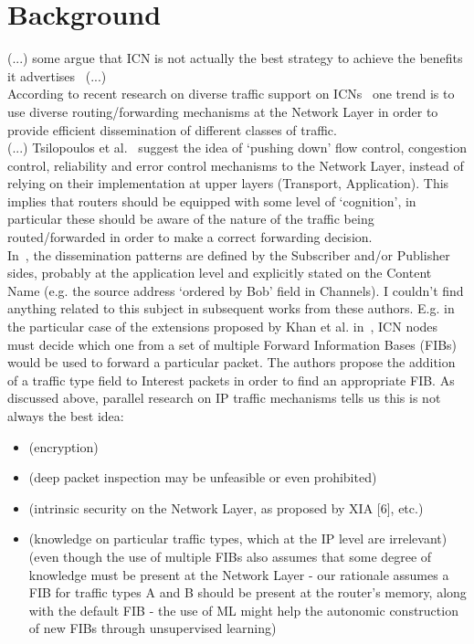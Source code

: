 \section{Background}
\label{sec:rel-work}

(...) some argue that ICN is not actually the best strategy to achieve the 
benefits it advertises~\cite{Ghodsi2011b} (...)\\

According to recent research on diverse traffic support on 
ICNs~\cite{Tsilopoulos2011, Khan2012}  one trend is to use 
diverse routing\slash forwarding mechanisms at the Network Layer in order to 
provide efficient dissemination of different classes of traffic.\\ 

(...) Tsilopoulos et al.~\cite{Tsilopoulos2011} suggest the 
idea of `pushing down' flow control, congestion control, reliability and error 
control mechanisms to the Network Layer, instead of relying on their 
implementation at upper layers (Transport, Application). This implies that 
routers should be equipped with some level of `cognition', in particular these 
should be aware of the nature of the traffic being routed/forwarded in order to 
make a correct forwarding decision.\\

In~\cite{Tsilopoulos2011}, the dissemination patterns are 
defined by the Subscriber and\slash or Publisher sides, probably at the 
application level and explicitly stated on the Content Name (e.g. the source 
address `ordered by Bob' field in Channels). I couldn't find anything related 
to this subject in subsequent works from these authors. E.g. in the particular 
case of the extensions proposed by Khan et al. in~\cite{Khan2012}, ICN nodes must 
decide which one from a set of multiple Forward Information Bases (FIBs) would 
be used to forward a particular packet. The authors propose the addition of a 
traffic type field to Interest packets in order to find an appropriate FIB. As 
discussed above, parallel research on IP traffic mechanisms tells us this is not 
always the best idea:

\begin{itemize}
    \item (encryption)
    \item (deep packet inspection may be unfeasible or even prohibited)
    \item (intrinsic security on the Network Layer, as proposed by XIA [6], 
            etc.)
    \item (knowledge on particular traffic types, which at the IP level are 
            irrelevant) (even though the use of multiple FIBs also assumes that 
            some degree of knowledge must be present at the Network Layer - our 
            rationale assumes a FIB for traffic types A and B should be present 
            at the router's memory, along with the default FIB - the use of ML 
            might help the autonomic construction of new FIBs through 
            unsupervised learning)
\end{itemize}

